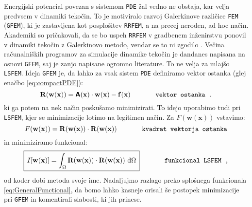 Energijski potencial povezan s sistemom \texttt{PDE} žal vedno ne obstaja, kar velja predvsem v dinamiki tekočin. To je motiviralo razvoj Galerkinove različice \texttt{FEM} (\texttt{GFEM}), ki je zastavljena kot posplošitev \texttt{RRFEM}, a na precej neroden, ad hoc način. Akademiki so pričakovali, da se bo uspeh \texttt{RRFEM} v gradbenem inženirstvu ponovil v dinamiki tekočin z Galerkinovo metodo, vendar se to ni zgodilo \cite{JiangB-LSFEM}. Večina računalniških programov za simulacije dinamike tekočin je dandanes napisana na osnovi \texttt{GFEM}, saj je zanjo napisane ogromno literature. To ne velja za mlajšo \texttt{LSFEM}. Ideja \texttt{GFEM} je, da lahko za vsak sistem \texttt{PDE} definiramo vektor ostanka (glej enačbo \eqref{eq:compactPDE}):
\begin{equation}
	\mathbf{R(w(x))} = \bm{\mathsf{A}}(\mathbf{x}) \cdot \mathbf{w(x)} - \mathbf{f(x)} \hspace{1.3cm} \texttt{vektor ostanka .}
	\label{eq:residual}
\end{equation}
ki ga potem na nek način poskušamo minimizirati. To idejo uporabimo tudi pri \texttt{LSFEM}, kjer se minimizacije lotimo na legitimen način. Za $F(\mathbf{w(x)})$ vstavimo:
\begin{equation}
	F(\mathbf{w(x)}) = \mathbf{R(w(x))} \cdot \mathbf{R(w(x))} \hspace{1.3cm} \texttt{kvadrat vektorja ostanka}
\end{equation}
in minimiziramo funkcional:
\begin{equation}
	\boxed{\, I[\mathbf{w(x)}] = \int_{\Omega} \mathbf{R(w(x))} \cdot \mathbf{R(w(x))} \ \mathrm{d} \Omega \,} \hspace{1.3cm} \texttt{funkcional LSFEM ,}
\end{equation}
od koder dobi metoda svoje ime. Nadaljuj\-mo razlago preko splošnega funkcionala \eqref{eq:GeneralFunctional}, da bomo lahko kasneje orisali še postopek minimizacije pri \texttt{GFEM} in komentirali slabosti, ki jih prinese.


